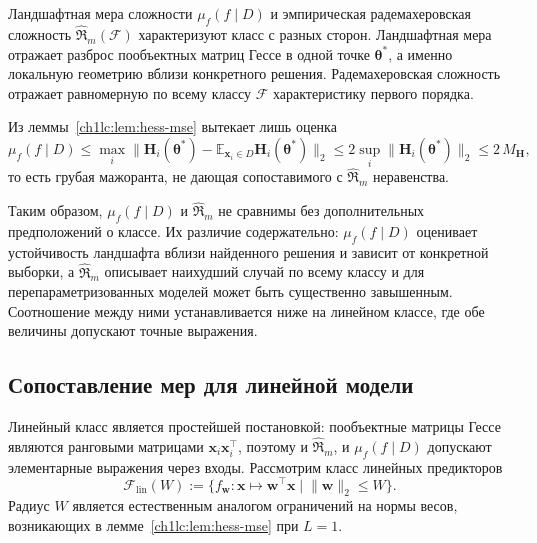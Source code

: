 \begin{remark}\label{ch1lc:rem:local-global}
Ландшафтная мера сложности $\mu_f(f\mid D)$ и эмпирическая радемахеровская сложность $\hat{\mathfrak{R}}_m(\mathcal{F})$ характеризуют класс с разных сторон.
Ландшафтная мера отражает разброс пообъектных матриц Гессе в одной точке $\boldsymbol{\theta}^*$, а именно локальную геометрию вблизи конкретного решения.
Радемахеровская сложность отражает равномерную по всему классу $\mathcal{F}$ характеристику первого порядка.

Из леммы~\ref{ch1lc:lem:hess-mse} вытекает лишь оценка
\[
  \mu_f(f\mid D)\le \max_i\bigl\|\mathbf{H}_i(\boldsymbol{\theta}^*)-\mathbb{E}_{\mathbf{x}_i\in D}\mathbf{H}_{i}(\boldsymbol{\theta}^*)\bigr\|_2
  \le 2\sup_i\bigl\|\mathbf{H}_i(\boldsymbol{\theta}^*)\bigr\|_2\le 2\,M_{\mathbf{H}},
\]
то есть грубая мажоранта, не дающая сопоставимого с $\hat{\mathfrak{R}}_m$ неравенства.

Таким образом, $\mu_f(f\mid D)$ и $\hat{\mathfrak{R}}_m$ не сравнимы без дополнительных предположений о классе.
Их различие содержательно: $\mu_f(f\mid D)$ оценивает устойчивость ландшафта вблизи найденного решения и зависит от конкретной выборки, а $\hat{\mathfrak{R}}_m$ описывает наихудший случай по всему классу и для перепараметризованных моделей может быть существенно завышенным.
Соотношение между ними устанавливается ниже на линейном классе, где обе величины допускают точные выражения.
\end{remark}

\subsection{Сопоставление мер для линейной модели}\label{ch1lc:subsec:linear-comp}

Линейный класс является простейшей постановкой: пообъектные матрицы Гессе являются ранговыми матрицами $\mathbf{x}_i\mathbf{x}_i^{\top}$, поэтому и $\hat{\mathfrak{R}}_m$, и $\mu_f(f\mid D)$ допускают элементарные выражения через входы.
Рассмотрим класс линейных предикторов
\begin{equation}\label{ch1lc:eq:F-lin}
  \mathcal{F}_{\mathrm{lin}}(W)
  := \bigl\{ f_{\mathbf{w}}:\mathbf{x}\mapsto \mathbf{w}^{\top}\mathbf{x} \;\big|\; \|\mathbf{w}\|_2\le W \bigr\}.
\end{equation}
Радиус $W$ является естественным аналогом ограничений на нормы весов, возникающих в лемме~\ref{ch1lc:lem:hess-mse} при $L=1$.

